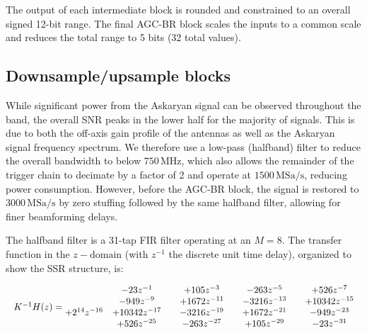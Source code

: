\documentclass{IEEEtran}
\begin{document}
The output of each intermediate block is rounded and constrained to an
overall signed 12-bit range. The final AGC-BR block scales the inputs to
a common scale and reduces the total range to 5 bits (32 total values).

\subsection{Downsample/upsample blocks}

While significant power from the Askaryan signal can be observed throughout the
band, the overall SNR peaks in the lower half for the majority of signals.
This is due to both the off-axis gain profile of the antennas
as well as the Askaryan signal frequency spectrum. We therefore use a 
low-pass (halfband) filter to reduce the overall bandwidth to below
$750\,\text{MHz}$, which also allows the remainder of the trigger chain 
to decimate by a factor of 2 and operate at $1500\,\text{MSa/s}$,
reducing power consumption. However, before the AGC-BR block, the signal is restored
to $3000\,\text{MSa/s}$ by zero stuffing followed by the same halfband 
filter, allowing for finer beamforming delays.

The halfband filter is a 31-tap FIR filter operating at an $M=8$. The transfer 
function in the $z-\textrm{domain}$ (with $z^{-1}$ the discrete unit time delay), 
organized to show the SSR structure, is:


\[
\resizebox{\hsize}{!}{%
	$K^{-1}H(z)=
	\begin{matrix}
		 & -23z^{-1} &  & +105z^{-3} &  & -263z^{-5} &  & +526z^{-7}\\
		 & -949z^{-9} &  & +1672z^{-11} &  & -3216z^{-13} &  & +10342z^{-15}\\
		+2^{14}z^{-16} & +10342z^{-17} &  & -3216z^{-19} &  & +1672z^{-21} &  & -949z^{-23}\\
		 & +526z^{-25} &  & -263z^{-27} &  & +105z^{-29} &  & -23z^{-31} \\
	\end{matrix}
	$%
}
\]
\end{document}
